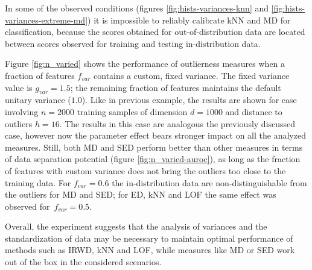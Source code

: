 In some of the observed conditions (figures \ref{fig:hists-variances-knn} and \ref{fig:hists-variances-extreme-md}) it is impossible to reliably calibrate kNN and MD for classification, because the scores obtained for out-of-distribution data are located between scores observed for training and testing in-distribution data.

Figure \ref{fig:n_varied} shows the performance of outlierness measures when a fraction of features $f_{var}$ contains a custom, fixed variance. The fixed variance value is $g_{var} = 1.5$; the remaining fraction of features maintains the default unitary variance ($1.0$). Like in previous example, the results are shown for case involving $n = 2000$ training samples of dimension $d = 1000$ and distance to outliers $h = 16$. The results in this case are analogous the previously discussed case, however now the parameter effect bears stronger impact on all the analyzed measures. Still, both MD and SED perform better than other measures in terms of data separation potential (figure \ref{fig:n_varied-auroc}), as long as the fraction of features with custom variance does not bring the outliers too close to the training data. For $f_{var} = 0.6$ the in-distribution data are non-distinguishable from the outliers for MD and SED; for ED, kNN and LOF the same effect was observed for~$f_{var} = 0.5$.

Overall, the experiment suggests that the analysis of variances and the standardization of data may be necessary to maintain optimal performance of methods such as IRWD, kNN and LOF, while measures like MD or SED work out of the box in the considered scenarios.

